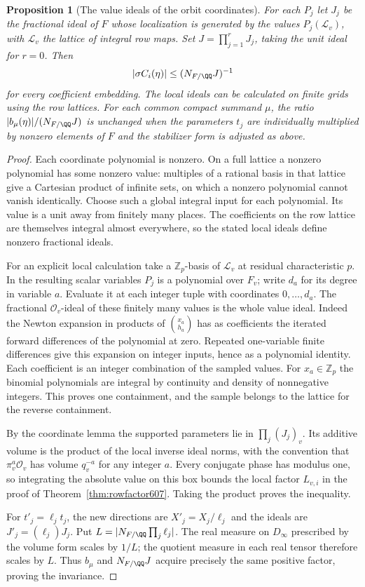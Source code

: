 \documentclass[a4paper,11pt]{article}
\newtheorem{proposition}{Proposition}[section]
\theoremstyle{definition}
\theoremstyle{remark}
\newcommand{\ZZ}{\mathbb Z}\newcommand{\ord}{\operatorname{ord}}
\numberwithin{equation}{section}
\begin{document}
\begin{proposition}[The value ideals of the orbit coordinates]
\leavevmode\label{prop:valueideals607}
For each \(P_j\) let \(J_j\) be the fractional ideal of \(F\)
whose localization is generated by the values
\(P_j(\mathcal L_v)\), with \(\mathcal L_v\) the lattice of
integral row maps. Set \(J=\prod_{j=1}^r J_j\), taking the
unit ideal for \(r=0\). Then
\[
                 |\sigma C_i(\eta)|\le (N_{F/\QQ}J)^{-1}
\]
for every coefficient embedding. The local ideals can be
calculated on finite grids using the row lattices. For each
common compact summand \(\mu\), the ratio
\(|b_\mu(\eta)|/(N_{F/\QQ}J)\) is unchanged when the
parameters \(t_j\) are individually multiplied by nonzero
elements of \(F\) and the stabilizer form is adjusted as above.
\end{proposition}
\begin{proof}
Each coordinate polynomial is nonzero. On a full lattice a
nonzero polynomial has some nonzero value: multiples of a
rational basis in that lattice give a Cartesian product of
infinite sets, on which a nonzero polynomial cannot vanish
identically. Choose such a global integral input for each
polynomial. Its value is a unit away from finitely many
places. The coefficients on the row lattice are themselves
integral almost everywhere, so the stated local ideals
define nonzero fractional ideals.

For an explicit local calculation take a \(\ZZ_p\)-basis of
\(\mathcal L_v\) at residual characteristic \(p\). In the
resulting scalar variables \(P_j\) is a polynomial over \(F_v\);
write \(d_a\) for its degree in variable \(a\). Evaluate it
at each integer tuple with coordinates \(0,\ldots,d_a\).
The fractional \(\mathcal O_v\)-ideal of these finitely many
values is the whole value ideal. Indeed the Newton expansion
in products of \(\binom{x_a}{h_a}\) has as coefficients the
iterated forward differences of the polynomial at zero.
Repeated one-variable finite differences give this expansion
on integer inputs, hence as a polynomial identity. Each
coefficient is an integer combination of the sampled values.
For \(x_a\in\ZZ_p\) the binomial polynomials are integral by
continuity and density of nonnegative integers. This proves
one containment, and the sample belongs to the lattice for
the reverse containment.

By the coordinate lemma the supported parameters lie in
\(\prod_j (J_j)_v\). Its additive volume is the product of
the local inverse ideal norms, with the convention that
\(\pi_v^a\mathcal O_v\) has volume \(q_v^{-a}\) for any
integer \(a\). Every conjugate phase has modulus one, so
integrating the absolute value on this box bounds the local
factor \(L_{v,i}\) in the proof of Theorem~\ref{thm:rowfactor607}.
Taking the product proves the inequality.

For \(t'_j=\ell_j t_j\), the new directions are
\(X'_j=X_j/\ell_j\) and the ideals are \(J'_j=(\ell_j)J_j\).
Put \(L=|N_{F/\QQ}\prod_j\ell_j|\). The real measure on
\(D_\infty\) prescribed by the volume form scales by \(1/L\);
the quotient measure in each real tensor therefore scales by
\(L\). Thus \(b_\mu\) and \(N_{F/\QQ}J\) acquire precisely
the same positive factor, proving the invariance.
\end{proof}
\end{document}
